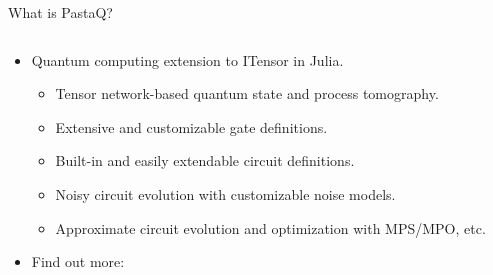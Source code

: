 \begin{frame}{What is PastaQ?}
\begin{columns}
\end{columns}

\begin{itemize}[<+->]

  \item Quantum computing extension to ITensor in Julia.

  \begin{itemize}[<+->]

    \item Tensor network-based quantum state and process tomography. 
    \item Extensive and customizable gate definitions.
    \item Built-in and easily extendable circuit definitions.
    \item Noisy circuit evolution with customizable noise models.
    \item Approximate circuit evolution and optimization with MPS/MPO, etc.

  \end{itemize}

  \item Find out more: 

\end{itemize}

\end{frame}
